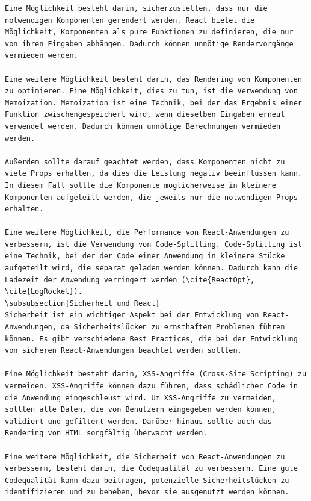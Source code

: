 \begin{lstlisting}
Eine Möglichkeit besteht darin, sicherzustellen, dass nur die notwendigen Komponenten gerendert werden. React bietet die Möglichkeit, Komponenten als pure Funktionen zu definieren, die nur von ihren Eingaben abhängen. Dadurch können unnötige Rendervorgänge vermieden werden.

Eine weitere Möglichkeit besteht darin, das Rendering von Komponenten zu optimieren. Eine Möglichkeit, dies zu tun, ist die Verwendung von Memoization. Memoization ist eine Technik, bei der das Ergebnis einer Funktion zwischengespeichert wird, wenn dieselben Eingaben erneut verwendet werden. Dadurch können unnötige Berechnungen vermieden werden.

Außerdem sollte darauf geachtet werden, dass Komponenten nicht zu viele Props erhalten, da dies die Leistung negativ beeinflussen kann. In diesem Fall sollte die Komponente möglicherweise in kleinere Komponenten aufgeteilt werden, die jeweils nur die notwendigen Props erhalten.

Eine weitere Möglichkeit, die Performance von React-Anwendungen zu verbessern, ist die Verwendung von Code-Splitting. Code-Splitting ist eine Technik, bei der der Code einer Anwendung in kleinere Stücke aufgeteilt wird, die separat geladen werden können. Dadurch kann die Ladezeit der Anwendung verringert werden (\cite{ReactOpt}, \cite{LogRocket}).
\subsubsection{Sicherheit und React}
Sicherheit ist ein wichtiger Aspekt bei der Entwicklung von React-Anwendungen, da Sicherheitslücken zu ernsthaften Problemen führen können. Es gibt verschiedene Best Practices, die bei der Entwicklung von sicheren React-Anwendungen beachtet werden sollten.

Eine Möglichkeit besteht darin, XSS-Angriffe (Cross-Site Scripting) zu vermeiden. XSS-Angriffe können dazu führen, dass schädlicher Code in die Anwendung eingeschleust wird. Um XSS-Angriffe zu vermeiden, sollten alle Daten, die von Benutzern eingegeben werden können, validiert und gefiltert werden. Darüber hinaus sollte auch das Rendering von HTML sorgfältig überwacht werden.

Eine weitere Möglichkeit, die Sicherheit von React-Anwendungen zu verbessern, besteht darin, die Codequalität zu verbessern. Eine gute Codequalität kann dazu beitragen, potenzielle Sicherheitslücken zu identifizieren und zu beheben, bevor sie ausgenutzt werden können.


\end{lstlisting}
